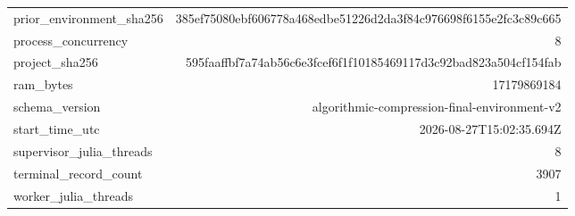 {\begin{longtable}{lr}
prior\_environment\_sha256 & 385ef75080ebf606778a468edbe51226d2da3f84c976698f6155e2fc3c89c665 \\
process\_concurrency & 8 \\
project\_sha256 & 595faaffbf7a74ab56c6e3fcef6f1f10185469117d3c92bad823a504cf154fab \\
ram\_bytes & 17179869184 \\
schema\_version & algorithmic-compression-final-environment-v2 \\
start\_time\_utc & 2026-08-27T15:02:35.694Z \\
supervisor\_julia\_threads & 8 \\
terminal\_record\_count & 3907 \\
worker\_julia\_threads & 1 \\
\bottomrule
\end{longtable}
}
